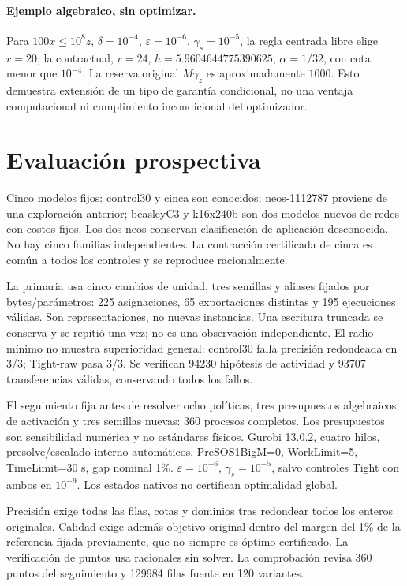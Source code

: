 \documentclass[10pt,a4paper]{article}
\begin{document}
\paragraph{Ejemplo algebraico, sin optimizar.}
Para $100x\le10^8z$, $\delta=10^{-4}$, $\varepsilon=10^{-6}$,
$\gamma_s=10^{-5}$, la regla centrada libre elige $r=20$; la contractual,
$r=24$, $h=5.9604644775390625$, $\alpha=1/32$, con cota menor que $10^{-4}$.
La reserva original $M\gamma_z$ es aproximadamente $1000$.
Esto demuestra extensión de un tipo de garantía condicional, no una ventaja
computacional ni cumplimiento incondicional del optimizador.

\section{Evaluación prospectiva}
Cinco modelos fijos: control30 y cinca son conocidos; neos-1112787 proviene
de una exploración anterior; beasleyC3 y k16x240b son dos modelos nuevos de
redes con costos fijos. Los dos neos conservan clasificación de aplicación
desconocida. No hay cinco familias independientes. La contracción certificada
de cinca es común a todos los controles y se reproduce racionalmente.

La primaria usa cinco cambios de unidad, tres semillas y aliases fijados por
bytes/parámetros: 225 asignaciones, 65 exportaciones distintas y 195 ejecuciones
válidas. Son representaciones, no nuevas instancias. Una escritura truncada
se conserva y se repitió una vez; no es una observación independiente.
El radio mínimo no muestra superioridad general: control30 falla precisión
redondeada en 3/3; Tight-raw pasa 3/3. Se verifican 94230 hipótesis de
actividad y 93707 transferencias válidas, conservando todos los fallos.

El seguimiento fija antes de resolver ocho políticas, tres presupuestos
algebraicos de activación y tres semillas nuevas: 360 procesos completos.
Los presupuestos son sensibilidad numérica y no estándares físicos.
Gurobi 13.0.2, cuatro hilos, presolve/escalado interno automáticos,
PreSOS1BigM=0, WorkLimit=5, TimeLimit=30 s, gap nominal 1\%.
$\varepsilon=10^{-6}$, $\gamma_s=10^{-5}$, salvo controles Tight con ambos
en $10^{-9}$. Los estados nativos no certifican optimalidad global.

Precisión exige todas las filas, cotas y dominios tras redondear todos los
enteros originales. Calidad exige además objetivo original dentro del margen
del 1\% de la referencia fijada previamente, que no siempre es óptimo certificado.
La verificación de puntos usa racionales sin solver. La comprobación revisa
360 puntos del seguimiento y 129984 filas fuente en 120 variantes.
\end{document}
